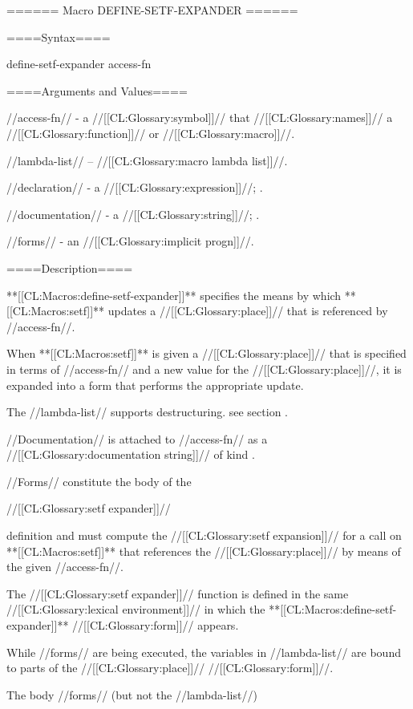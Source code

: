 ====== Macro DEFINE-SETF-EXPANDER ======

====Syntax====

\DefmacWithValuesNewline define-setf-expander {} {access-fn}

====Arguments and Values====

//access-fn// - a //[[CL:Glossary:symbol]]// that //[[CL:Glossary:names]]// a //[[CL:Glossary:function]]// or //[[CL:Glossary:macro]]//.

//lambda-list// -- //[[CL:Glossary:macro lambda list]]//.

//declaration// - a  //[[CL:Glossary:expression]]//; \noeval.

//documentation// - a //[[CL:Glossary:string]]//; \noeval.

//forms// - an //[[CL:Glossary:implicit progn]]//.

====Description====

**[[CL:Macros:define-setf-expander]]** specifies the means by which **[[CL:Macros:setf]]** updates a //[[CL:Glossary:place]]// that is referenced by //access-fn//.

When **[[CL:Macros:setf]]** is given a //[[CL:Glossary:place]]// that is specified in terms of //access-fn// and a new value for the //[[CL:Glossary:place]]//, it is expanded into a form that performs the appropriate update.

The //lambda-list// supports destructuring. see section {\secref\MacroLambdaLists}.

//Documentation// is attached to //access-fn// as a //[[CL:Glossary:documentation string]]// of kind .

//Forms// constitute the body of the

//[[CL:Glossary:setf expander]]//

definition and must compute the //[[CL:Glossary:setf expansion]]// for a call on **[[CL:Macros:setf]]** that references the //[[CL:Glossary:place]]// by means of the given //access-fn//.

The //[[CL:Glossary:setf expander]]// function is defined in the same //[[CL:Glossary:lexical environment]]// in which the **[[CL:Macros:define-setf-expander]]** //[[CL:Glossary:form]]// appears.

While //forms// are being executed, the variables in //lambda-list// are bound to parts of the //[[CL:Glossary:place]]// //[[CL:Glossary:form]]//.

The body //forms// (but not the //lambda-list//)

